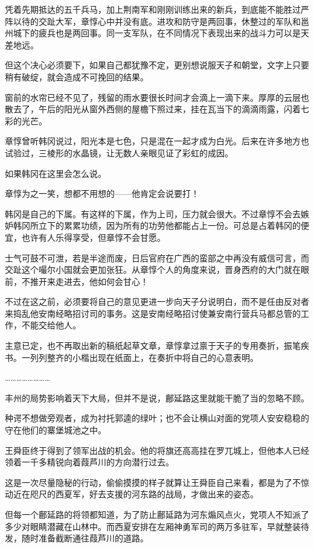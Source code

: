 凭着先期抵达的五千兵马，加上荆南军和刚刚训练出来的新兵，到底能不能胜过严阵以待的交趾大军，章惇心中并没有底。进攻和防守是两回事，休整过的军队和邕州城下的疲兵也是两回事。同一支军队，在不同情况下表现出来的战斗力可以是天差地远。

但这个决心必须要下，如果自己都犹豫不定，更别想说服天子和朝堂，文字上只要稍有破绽，就会造成不可挽回的结果。

窗前的水帘已经不见了，残留的雨水要很长时间才会滴上一滴下来。厚厚的云层也散去了，午后的阳光从窗外西侧的屋檐下照过来，挂在瓦当下的滴滴雨露，闪着七彩的光芒。

章惇曾听韩冈说过，阳光本是七色，只是混在一起才成为白光。后来在许多地方也试验过，三棱形的水晶镜，让无数人亲眼见证了彩虹的成因。

如果韩冈在这里会怎么说。

章惇为之一笑，想都不用想的——他肯定会说要打！

韩冈是自己的下属。有这样的下属，作为上司，压力就会很大。不过章惇不会去嫉妒韩冈所立下的累累功绩，因为所有的功劳他都能占上一份。可总是占着韩冈的便宜，也许有人乐得享受，但章惇不会甘愿。

士气可鼓不可泄，若是半途而废，日后官府在广西的蛮部之中再没有威信可言，而交趾这个嘬尔小国就会更加张狂。从章惇个人的角度来说，晋身西府的大门就在眼前，不推开来走进去，他如何会甘心！

不过在这之前，必须要将自己的意见更进一步向天子分说明白，而不是任由反对者来捣乱他安南经略招讨司的事务。这是安南经略招讨使兼安南行营兵马都总管的工作，不能交给他人。

主意已定，也不再取出新的稿纸起草文章，章惇拿过禀于天子的专用奏折，振笔疾书。一列列整齐的小楷出现在纸面上，在奏折中将自己的心意表明。

……………………

丰州的局势影响着天下大局，但并不是说，鄜延路这里就能干脆了当的忽略不顾。

种谔不想做旁观者，成为衬托郭逵的绿叶；也不会让横山对面的党项人安安稳稳的守在他们的寨堡城池之中。

王舜臣终于得到了领军出战的机会。他的将旗还高高挂在罗兀城上，但他本人已经领着一千多精锐向着葭芦川的方向潜行过去。

这是一次尽量隐秘的行动，偷偷摸摸的样子就算让王舜臣自己来看，都是为了不惊动近在咫尺的西夏军，好去支援的河东路的战局，才做出来的姿态。

但每一个鄜延路的将领都知道，为了防止鄜延路为河东煽风点火，党项人不知派了多少对眼睛潜藏在山林中。而西夏安排在左厢神勇军司的两万多驻军，早就整装待发，随时准备截断通往葭芦川的道路。

